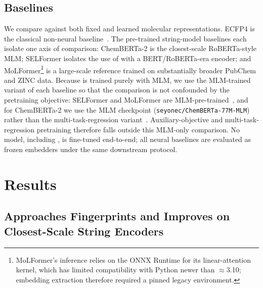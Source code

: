 \documentclass[11pt,a4paper]{article}
\begin{document}
\subsection{Baselines}
\label{sec:baselines}

We compare \model{} against both fixed and learned molecular representations.
ECFP4 is the classical non-neural baseline~\citep{rogersExtendedConnectivityFingerprints2010,yangAnalyzingLearnedMolecular2019,dengSystematicStudyKey2023}.
The pre-trained string-model baselines each isolate one axis of comparison:
ChemBERTa-2 is the closest-scale RoBERTa-style \smiles{} MLM; SELFormer
isolates the use of \selfies{} with a BERT/RoBERTa-era encoder; and
MoLFormer\footnote{MoLFormer's inference relies on the ONNX Runtime for its
linear-attention kernel, which has limited compatibility with Python newer than
$\approx$3.10; embedding extraction therefore required a pinned legacy
environment.} is a large-scale \smiles{} reference trained on substantially
broader PubChem and ZINC data.
Because \model{} is trained purely with MLM, we use the MLM-trained variant of
each baseline so that the comparison is not confounded by the pretraining
objective: SELFormer and MoLFormer are
MLM-pre-trained~\citep{yukselSELFormerMolecularRepresentation2023,rossLargescaleChemicalLanguage2022},
and for ChemBERTa-2 we use the MLM checkpoint
(\texttt{seyonec/ChemBERTa-77M-MLM}) rather than the multi-task-regression
variant~\citep{ahmadChemBERTa2TowardsChemical2022}. Auxiliary-objective and
multi-task-regression pretraining therefore falls outside this MLM-only
comparison. No model, including \model{}, is fine-tuned end-to-end; all neural
baselines are evaluated as frozen embedders under the same downstream protocol.

\section{Results}%
\label{sec:results}


\subsection{\model{} Approaches Fingerprints and Improves on Closest-Scale String Encoders}
\label{sec:main-results}
\end{document}
